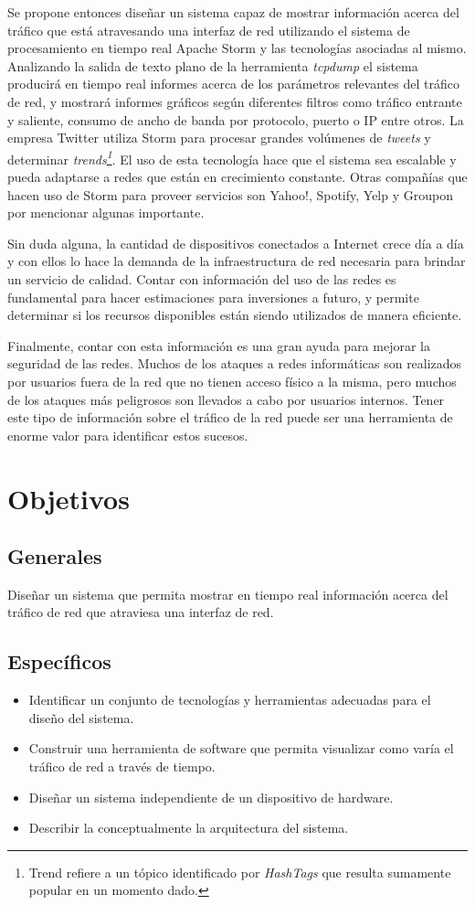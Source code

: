 Se propone entonces diseñar un sistema capaz de mostrar información acerca del tráfico que está atravesando una interfaz de red utilizando el sistema de procesamiento en tiempo real Apache Storm y las tecnologías asociadas al mismo. Analizando la salida de texto plano de la herramienta \textit{tcpdump} el sistema producirá en tiempo real informes acerca de los parámetros relevantes del tráfico de red, y mostrará informes gráficos según diferentes filtros como tráfico entrante y saliente, consumo de ancho de banda por protocolo, puerto o IP entre otros.
La empresa Twitter utiliza Storm para procesar grandes volúmenes de \textit{tweets} y determinar \textit{trends\footnote{Trend refiere a un tópico identificado por \textit{HashTags} que resulta sumamente popular en un momento dado.}}. El uso de esta tecnología hace que el sistema sea escalable y pueda adaptarse a redes que están en crecimiento constante. Otras compañías que hacen uso de Storm para proveer servicios son Yahoo!, Spotify, Yelp y Groupon por mencionar algunas importante.

Sin duda alguna, la cantidad de dispositivos conectados a Internet crece día a día y con ellos lo hace la demanda de la infraestructura de red necesaria para brindar un servicio de calidad. Contar con información del uso de las redes es fundamental para hacer estimaciones para inversiones a futuro, y permite determinar si los recursos disponibles están siendo utilizados de manera eficiente.

Finalmente, contar con esta información es una gran ayuda para mejorar la seguridad de las redes. Muchos de los ataques a redes informáticas son realizados por usuarios fuera de la red que no tienen acceso físico a la misma, pero muchos de los ataques más peligrosos son llevados a cabo por usuarios internos. Tener este tipo de información sobre el tráfico de la red puede ser una herramienta de enorme valor para identificar estos sucesos.

\section*{Objetivos}
\subsection*{Generales}
Diseñar un sistema que permita mostrar en tiempo real información acerca del tráfico de red que atraviesa una interfaz de red.
\subsection*{Específicos}
\begin{itemize}
\item Identificar un conjunto de tecnologías y herramientas adecuadas para el diseño del sistema.
\item Construir una herramienta de software que permita visualizar como varía el tráfico de red a través de tiempo.
\item Diseñar un sistema independiente de un dispositivo de hardware.
\item Describir la conceptualmente la arquitectura del sistema.
\end{itemize}

